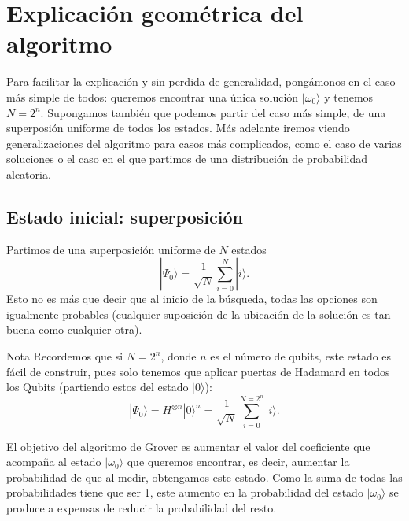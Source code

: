 \documentclass[a4paper,11pt]{article} %
\numberwithin{equation}{section}
\begin{document}


\newpage
\section{Explicación geométrica del algoritmo} \label{sec_geo}

Para facilitar la explicación y sin perdida de generalidad, pongámonos en el caso más simple de todos: queremos encontrar una única solución $| \omega_0 \rangle$ y tenemos $N=2^n$. Supongamos también que podemos partir del caso más simple, de una superposión uniforme de todos los estados. Más adelante iremos viendo generalizaciones del algoritmo para casos más complicados, como el caso de varias soluciones o el caso en el que partimos de una distribución de probabilidad aleatoria.

\subsection{Estado inicial: superposición}
			
Partimos de una superposición uniforme de $N$ estados 
\begin{equation} \label{ec_geo_phi-0_1}
| \Psi_0 \rangle = \frac{1}{\sqrt{N}}  \sum_{i=0}^{N} | i \rangle.
\end{equation}
Esto no es más que decir que al inicio de la búsqueda, todas las opciones son igualmente probables (cualquier suposición de la ubicación de la solución es tan buena como cualquier otra).


\begin{mybox}{Nota}
Recordemos que si $N=2^n$, donde $n$ es el número de qubits, este estado es fácil de construir, pues solo tenemos que aplicar puertas de Hadamard en todos los Qubits (partiendo estos del estado $|0 \rangle$):
\begin{equation} \label{ec_geo_phi_0_H}
|\Psi_0 \rangle = H^{\otimes n} |0 \rangle^{n} = \frac{1}{\sqrt{N}}  \sum_{i=0}^{N=2^n} | i \rangle.
\end{equation}
\end{mybox}

El objetivo del algoritmo de Grover es aumentar el valor del coeficiente que acompaña al estado $| \omega_0 \rangle$ que queremos encontrar, es decir, aumentar la probabilidad de que al medir, obtengamos este estado. Como la suma de todas las probabilidades tiene que ser 1, este aumento en la probabilidad del estado $| \omega_0 \rangle$ se produce a expensas de reducir la probabilidad del resto. 
\end{document}
